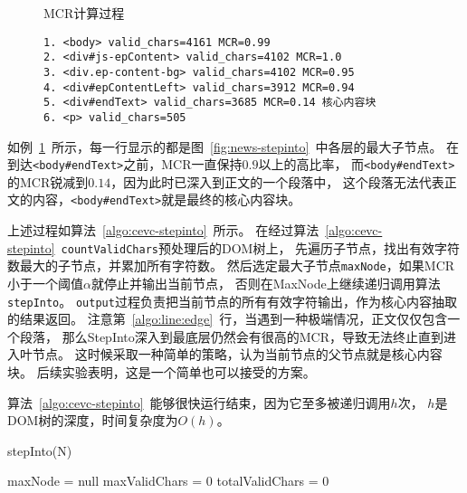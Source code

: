 \begin{figure}[htbp]
\begin{example}
\label{ex:mcr}
MCR计算过程
\end{example}
\begin{verbatim}
1. <body> valid_chars=4161 MCR=0.99
2. <div#js-epContent> valid_chars=4102 MCR=1.0
3. <div.ep-content-bg> valid_chars=4102 MCR=0.95
4. <div#epContentLeft> valid_chars=3912 MCR=0.94
5. <div#endText> valid_chars=3685 MCR=0.14 核心内容块
6. <p> valid_chars=505
\end{verbatim}
\end{figure}

如例~\ref{ex:mcr}~所示，每一行显示的都是图~\ref{fig:news-stepinto}~中各层的最大子节点。
在到达\texttt{<body\#endText>}之前，MCR一直保持$0.9$以上的高比率，
而\texttt{<body\#endText>}的MCR锐减到$0.14$，因为此时已深入到正文的一个段落中，
这个段落无法代表正文的内容，\texttt{<body\#endText>}就是最终的核心内容块。

上述过程如算法~\ref{algo:cevc-stepinto}~所示。
在经过算法~\ref{algo:cevc-stepinto}~\texttt{countValidChars}预处理后的DOM树上，
先遍历子节点，找出有效字符数最大的子节点，并累加所有字符数。
然后选定最大子节点\texttt{maxNode}，如果MCR小于一个阈值$\alpha$就停止并输出当前节点，
否则在MaxNode上继续递归调用算法\texttt{stepInto}。
\texttt{output}过程负责把当前节点的所有有效字符输出，作为核心内容抽取的结果返回。
注意第~\ref{algo:line:edge}~行，当遇到一种极端情况，正文仅仅包含一个段落，
那么StepInto深入到最底层仍然会有很高的MCR，导致无法终止直到进入叶节点。
这时候采取一种简单的策略，认为当前节点的父节点就是核心内容块。
后续实验表明，这是一个简单也可以接受的方案。

算法~\ref{algo:cevc-stepinto}~能够很快运行结束，因为它至多被递归调用$h$次，
$h$是DOM树的深度，时间复杂度为$O(h)$。

\begin{algorithm}[htbp]
\caption{stepInto(N)}
\label{algo:cevc-stepinto}

maxNode = null \;
maxValidChars = 0 \;
totalValidChars = 0 \;

\end{algorithm}

